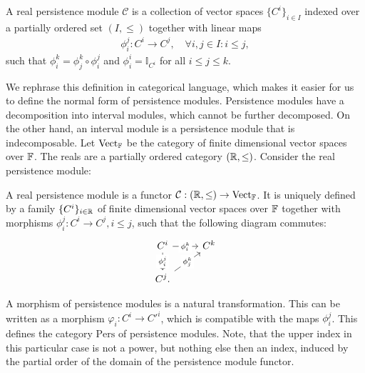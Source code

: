 \begin{definition}{\cite[\S 1.1]{chazal2016structure}}
A real persistence module $\mathcal{C}$ is a collection of vector spaces $\{C^i\}_{i \in I}$ indexed over a partially ordered set $(I,\leq)$ together with linear maps
\begin{align}
\phi_{i}^{j}: C^i \rightarrow C^j, \quad \forall i,j \in I: i \leq j,
\end{align}
such that $\phi_{i}^{k} = \phi^{k}_{j} \circ \phi_{i}^{j}$ and $\phi_{i}^i = \mathbb{I}_{C^i}$ for all $i \leq j \leq k$.
\end{definition}

We rephrase this definition in categorical language, which makes it easier for us to define the normal form of persistence modules. Persistence modules have a decomposition into interval modules, which cannot be further decomposed. On the other hand, an interval module is a persistence module that is indecomposable. Let $\operatorname{Vect}_{\mathbb{F}}$ be the category of finite dimensional vector spaces over ${\mathbb{F}}$. The reals are a partially ordered category $({\mathbb{R}}, \leq)$. Consider the real persistence module:

\begin{definition}{\cite[\S 1.3]{chazal2016structure}}
A real persistence module is a functor $\mathcal{C}: ({\mathbb{R}},\leq) \rightarrow \operatorname{Vect}_{\mathbb{F}}$. It is uniquely defined by a family $\{C^i\}_{i\in{\mathbb{R}}}$ of finite dimensional vector spaces over ${\mathbb{F}}$ together with morphisms $\phi_{i}^{j}: C^i \rightarrow C^j, i \leq j$, such that the following diagram commutes:
\begin{equation}
\begin{tikzcd}
C^i \arrow[d, "{\phi_{i}^{j}}"' description] \arrow[r, "{\phi_{i}^{k}}" description] & C^k \\
C^j. \arrow[ru, "{\phi_{j}^{k}}" description]                                      &    
\end{tikzcd}
\end{equation}
\end{definition}

\begin{remark}
A morphism of persistence modules is a natural transformation. This can be written as a morphism $\varphi_i: C^i \rightarrow {C'}^i$, which is compatible with the maps $\phi_{i}^{j}$. This defines the category $\mathrm{Pers}$ of persistence modules. Note, that the upper index in this particular case is not a power, but nothing else then an index, induced by the partial order of the domain of the persistence module functor.
\end{remark}

